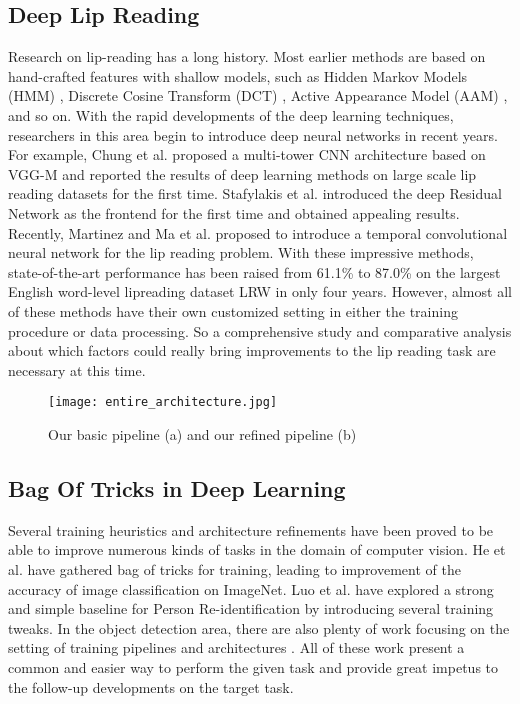 \documentclass{article}
\begin{document}
\subsection{Deep Lip Reading}
\vspace{-0.5em}
Research on lip-reading has a long history. Most earlier methods are based on hand-crafted features with shallow models, such as Hidden Markov Models (HMM) \cite{puviarasan2011lip}, Discrete Cosine Transform (DCT) \cite{hong2006pca}, Active Appearance Model (AAM) \cite{matthews1998lipreading}, and so on.
With the rapid developments of the deep learning techniques, researchers in this area begin to introduce deep neural networks in recent years. 
For example, Chung et al. \cite{chung2017liplrw} proposed a multi-tower CNN architecture based on VGG-M and reported the results of deep learning methods on large scale lip reading datasets for the first time. Stafylakis et al.\cite{stafylakiscombining, stafylakis2018pushing} introduced the deep Residual Network \cite{he2016deep} as the frontend for the first time and obtained appealing results. 
Recently, Martinez and Ma et al. \cite{martinez2020lipreading, ma2020towards} proposed to introduce a temporal convolutional neural network for the lip reading problem. 
With these impressive methods, state-of-the-art performance has been raised from 61.1\% to 87.0\% on the largest English word-level lipreading dataset LRW in only four years. However, almost all of these methods have their own customized setting in either the training procedure or data processing. So a comprehensive study and comparative analysis about which factors could really bring improvements to the lip reading task are necessary at this time.
\begin{figure}[t]
\label{Figure1}
\setlength{\abovecaptionskip}{-0.2cm}
\begin{minipage}[t]{1.0\linewidth}
  \centering
  \centerline{\texttt{[image: entire\_architecture.jpg]}}
\end{minipage}
\vspace{-0.2cm}
\caption{Our basic pipeline (a) and our refined pipeline (b)}
\label{fig:architecture}
\end{figure}
\vspace{-0.5em}
\subsection{Bag Of Tricks in Deep Learning}
\vspace{-0.5em}
Several training heuristics and architecture refinements have been proved to be able to improve numerous kinds of tasks in the domain of computer vision. 
He et al. \cite{he2019bag} have gathered bag of tricks for training, leading to improvement of the accuracy of image classification on ImageNet. Luo et al. \cite{luo2019bag} have explored a strong and simple baseline for Person Re-identification by introducing several training tweaks. In the object detection area, there are also plenty of work focusing on the setting of training pipelines and architectures \cite{zhang2019bag,redmon2018yolov3,bochkovskiy2020yolov4}. All of these work present a common and easier way to perform the given task and provide great impetus to the follow-up developments on the target task.
\vspace{-1.2em}
\end{document}
